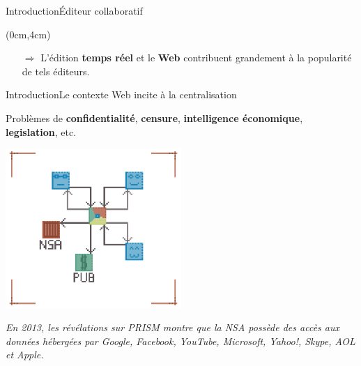 \begin{frame}{Introduction}{Éditeur collaboratif}
  \begin{textblock*}{\textwidth}(0cm,4cm)
    \large
    \begin{itemize}
    \item[$\Rightarrow$] L'édition \textbf{temps réel} et le \textbf{Web}
      contribuent grandement à la popularité de tels éditeurs.
    \end{itemize}    
  \end{textblock*}
\end{frame}


\begin{frame}{Introduction}{Le contexte Web incite à la centralisation}
  
  Problèmes de \textbf{confidentialité}, \textbf{censure},
  \textbf{intelligence économique}, \textbf{legislation}, etc.

  \vspace{0.5cm}
  \begin{center}
    \includegraphics[width=0.5\textwidth]{img/centralizedethicproblems.png}
  \end{center}
  
  \vspace{0.5cm}

  \textit{En 2013, les révélations sur PRISM montre que la NSA possède des
    accès aux données hébergées par Google, Facebook, YouTube, Microsoft,
    Yahoo!, Skype, AOL et Apple.}

\end{frame}

